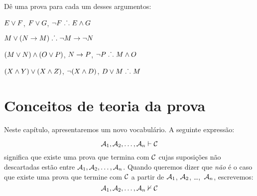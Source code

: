 \begin{earg}
\item 
	\begin{fitchproof}
 {}
 {}
\end{fitchproof}
\item\begin{fitchproof}
\open
\close
{}
\end{fitchproof}
\item\begin{fitchproof}
\open
	 {}
		\open
	\close
\close
{}
\end{fitchproof}
\end{earg}

\problempart 
D\^e uma prova para cada um desses argumentos:
\begin{earg}
\item $E\vee F$, $F\vee G$, $\neg F \mathrel{\ldotp\dot{}\,\ldotp} E \wedge G$
\item $M\vee(N\rightarrow M) \mathrel{\ldotp\dot{}\,\ldotp} \neg M \rightarrow \neg N$
\item $(M \vee N) \wedge (O \vee P)$, $N \rightarrow P$, $\neg P \mathrel{\ldotp\dot{}\,\ldotp} M\wedge O$
\item $(X\wedge Y)\vee(X\wedge Z)$, $\neg(X\wedge D)$, $D\vee M \mathrel{\ldotp\dot{}\,\ldotp} M$
\end{earg}


\chapter{Conceitos de teoria da prova}\label{s:ProofTheoreticConcepts}

 Neste cap\'itulo, apresentaremos um novo vocabul\'ario. A seguinte express\~ao:
 
$$\mathcal{A}_1, \mathcal{A}_2, \ldots, \mathcal{A}_n \vdash \mathcal{C}$$
significa que existe uma prova que termina com $\mathcal{C}$  cujas suposi\c c\~oes n\~ao descartadas est\~ao entre $\mathcal{A}_1, \mathcal{A}_2, \ldots, \mathcal{A}_n$. Quando queremos dizer que  \emph{n\~ao} \'e o caso que existe uma prova que termine com $\mathcal{C}$ a partir de $\mathcal{A}_1$, $\mathcal{A}_2$, \dots,~$\mathcal{A}_n$, escrevemos:  $$\mathcal{A}_1, \mathcal{A}_2, \ldots, \mathcal{A}_n \nvdash \mathcal{C}$$  

